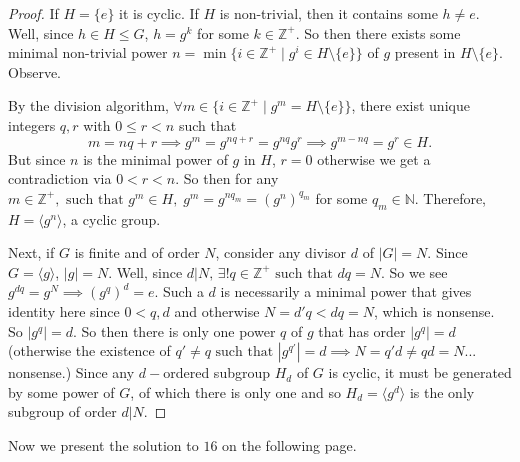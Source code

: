 \documentclass[addpoints,10pt]{exam}
\theoremstyle{plain}
\theoremstyle{definition}
\theoremstyle{plain}
\theoremstyle{plain}
\theoremstyle{definition}
\newcommand{\NN}{\ensuremath{\mathbb{N}}}
\newcommand{\ZZ}{\ensuremath{\mathbb{Z}}}
\begin{document}
\begin{proof}
  If $H=\{e\}$ it is cyclic. If $H$ is non-trivial, then it contains some $h\neq e.$ Well, since $h\in H\leq G$, $h=g^{k}$ for some $k\in\ZZ^{+}$. So then there exists some minimal non-trivial power $n=\min \{i\in \ZZ^{+}\mid g^{i}\in H\setminus \{e\}\}$ of $g$ present in $H\setminus\{e\}$. Observe.

  By the division algorithm, $\forall m\in \{i\in \ZZ^{+}\mid g^{m}=H\setminus\{e\}\}$, there exist unique integers $q,r$ with $0\leq r<n$ such that
  $$m=nq+r\implies g^{m}=g^{nq+r}=g^{nq}g^{r}\implies g^{m-nq}=g^{r}\in H.$$
  But since $n$ is the minimal power of $g$ in $H$, $r=0$ otherwise we get a contradiction via $0<r<n$. So then for any $m\in \ZZ^{+},\text{ such that }g^{m}\in H,\;g^{m}=g^{nq_{m}}=(g^{n})^{q_{m}}$ for some $q_{m}\in \NN$. Therefore, $H=\langle g^{n}\rangle$, a cyclic group.

  Next, if $G$ is finite and of order $N$, consider any divisor $d$ of $|G|=N$. Since $G=\langle g\rangle$, $|g|=N$. Well, since $d|N,\,\exists!q\in \ZZ^{+}\text{ such that }dq=N$. So we see $g^{dq}=g^{N}\implies (g^{q})^{d}=e$. Such a $d$ is necessarily a minimal power that gives identity here since $0<q,d$ and otherwise $N=d'q<dq=N$, which is nonsense. So $|g^{q}|=d.$ So then there is only one power $q$ of $g$ that has order $|g^{q}|=d$ (otherwise the existence of $q'\neq q\text{ such that }|g^{q'}|=d\implies N=q'd\neq qd=N$... nonsense.) Since any $d-$ordered subgroup $H_{d}$ of $G$ is cyclic, it must be generated by some power of $G$, of which there is only one and so $H_{d}=\langle g^{d}\rangle$ is the only subgroup of order $d|N.$
   
\end{proof}
Now we present the solution to $16$ on the following page.
\newpage
\setcounter{thm}{15}   %
\end{document}
